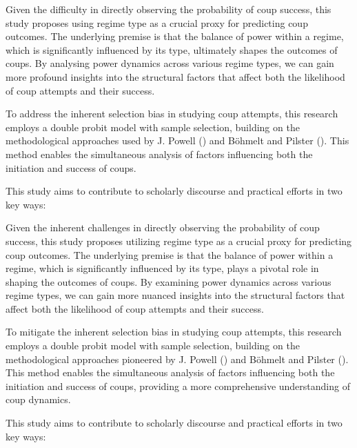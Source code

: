 \documentclass[
  12pt,
]{report}
\begin{document}
Given the difficulty in directly observing the probability of coup
success, this study proposes using regime type as a crucial proxy for
predicting coup outcomes. The underlying premise is that the balance of
power within a regime, which is significantly influenced by its type,
ultimately shapes the outcomes of coups. By analysing power dynamics
across various regime types, we can gain more profound insights into the
structural factors that affect both the likelihood of coup attempts and
their success.

To address the inherent selection bias in studying coup attempts, this
research employs a double probit model with sample selection, building
on the methodological approaches used by J. Powell
() and Böhmelt and Pilster
(). This method enables the
simultaneous analysis of factors influencing both the initiation and
success of coups.

This study aims to contribute to scholarly discourse and practical
efforts in two key ways:

Given the inherent challenges in directly observing the probability of
coup success, this study proposes utilizing regime type as a crucial
proxy for predicting coup outcomes. The underlying premise is that the
balance of power within a regime, which is significantly influenced by
its type, plays a pivotal role in shaping the outcomes of coups. By
examining power dynamics across various regime types, we can gain more
nuanced insights into the structural factors that affect both the
likelihood of coup attempts and their success.

To mitigate the inherent selection bias in studying coup attempts, this
research employs a double probit model with sample selection, building
on the methodological approaches pioneered by J. Powell
() and Böhmelt and Pilster
(). This method enables the
simultaneous analysis of factors influencing both the initiation and
success of coups, providing a more comprehensive understanding of coup
dynamics.

This study aims to contribute to scholarly discourse and practical
efforts in two key ways:
\end{document}
